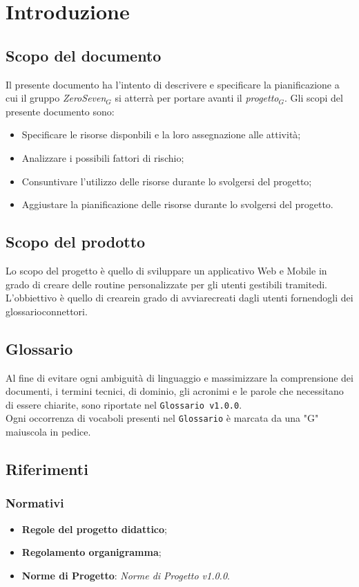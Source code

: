 \chapter{Introduzione}
\section{Scopo del documento}
Il presente documento ha l'intento di descrivere e specificare la pianificazione a cui il gruppo \textit{ZeroSeven$_{G}$} si atterrà per portare avanti il \textit{progetto$_{G}$}.
Gli scopi del presente documento sono:
\begin{itemize}
	\item Specificare le risorse disponbili e la loro assegnazione alle attività;
	\item Analizzare i possibili fattori di rischio;
	\item Consuntivare l'utilizzo delle risorse durante lo svolgersi del progetto;
	\item Aggiustare la pianificazione delle risorse durante lo svolgersi del progetto.
\end{itemize}
\section{Scopo del prodotto}
Lo scopo del progetto è quello di sviluppare un applicativo Web e Mobile in grado di creare delle routine personalizzate per gli utenti gestibili tramitedi. L'obbiettivo è quello di crearein grado di avviarecreati dagli utenti fornendogli dei glossario{connettori}.
\section{Glossario}
Al fine di evitare ogni ambiguità di linguaggio e massimizzare la comprensione dei documenti, i termini tecnici, di dominio, gli acronimi e le parole che necessitano di essere chiarite, sono riportate nel \texttt{Glossario v1.0.0}.\\
Ogni occorrenza di vocaboli presenti nel \texttt{Glossario} è marcata da una "G" maiuscola in pedice.
\section{Riferimenti}
\subsection{Normativi}
\begin{itemize}
	\item \textbf{Regole del progetto didattico};
	\item  \textbf{Regolamento organigramma};
	\item  \textbf{Norme di Progetto}: \textit{Norme di Progetto v1.0.0}.
\end{itemize}
